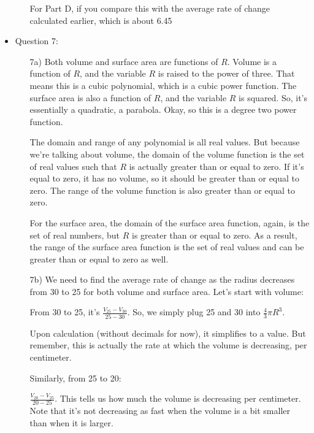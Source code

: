 \documentclass{article}
\begin{document}
\begin{itemize}
\begin{enumerate}
For Part D, if you compare this with the average rate of change calculated earlier, which is about 6.45%

\end{enumerate}
\newpage
\item Question 7:
\begin{enumerate}
    \item[7a)]Both volume and surface area are functions of \( R \). Volume is a function of \( R \), and the variable \( R \) is raised to the power of three. That means this is a cubic polynomial, which is a cubic power function. The surface area is also a function of \( R \), and the variable \( R \) is squared. So, it's essentially a quadratic, a parabola. Okay, so this is a degree two power function.

The domain and range of any polynomial is all real values. But because we're talking about volume, the domain of the volume function is the set of real values such that \( R \) is actually greater than or equal to zero. If it's equal to zero, it has no volume, so it should be greater than or equal to zero. The range of the volume function is also greater than or equal to zero.

For the surface area, the domain of the surface area function, again, is the set of real numbers, but \( R \) is greater than or equal to zero. As a result, the range of the surface area function is the set of real values and can be greater than or equal to zero as well.
 \item[7b)]We need to find the average rate of change as the radius decreases from 30 to 25 for both volume and surface area. Let's start with volume:

From 30 to 25, it's \(\frac{{V_{25} - V_{30}}}{{25 - 30}}\). So, we simply plug 25 and 30 into \(\frac{4}{3} \pi R^3\). 

Upon calculation (without decimals for now), it simplifies to a value. But remember, this is actually the rate at which the volume is decreasing, per centimeter.

Similarly, from 25 to 20:

\(\frac{{V_{20} - V_{25}}}{{20 - 25}}\). This tells us how much the volume is decreasing per centimeter. Note that it's not decreasing as fast when the volume is a bit smaller than when it is larger.


\end{enumerate}
\end{itemize}
\end{document}
